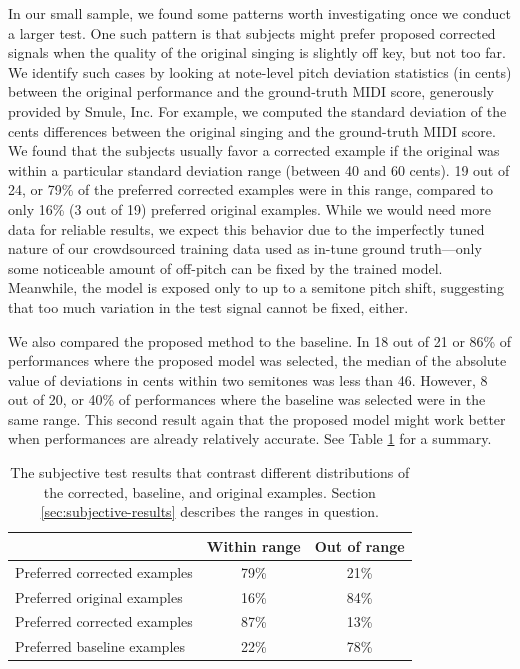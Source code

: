 In our small sample, we found some patterns worth investigating once we conduct a larger test. One such pattern is that subjects might prefer proposed corrected signals when the quality of the original singing is slightly off key, but not too far. We identify such cases by looking at note-level pitch deviation statistics (in cents) between the original performance and the ground-truth MIDI score, generously provided by Smule, Inc. For example, we computed the standard deviation of the cents differences between the original singing and the ground-truth MIDI score. We found that the subjects usually favor a corrected example if the original was within a particular standard deviation range (between 40 and 60 cents). 19 out of 24, or 79\% of the preferred corrected examples were in this range, compared to only 16\% (3 out of 19) preferred original examples. While we would need more data for reliable results, we expect this behavior due to the imperfectly tuned nature of our crowdsourced training data used as in-tune ground truth---only some noticeable amount of off-pitch can be fixed by the trained model. Meanwhile, the model is exposed only to up to a semitone pitch shift, suggesting that too much variation in the test signal cannot be fixed, either. 

We also compared the proposed method to the baseline. In 18 out of 21 or 86\% of performances where the proposed model was selected, the median of the absolute value of deviations in cents within two semitones was less than 46. However, 8 out of 20, or 40\% of performances where the baseline was selected were in the same range. This second result again that the proposed model might work better when performances are already relatively accurate. See Table \ref{tab:result-autotune} for a summary. 

\begin{table}[t]
  \begin{center}
  \vspace{-0.05in}
    \caption{The subjective test results that contrast different distributions of the corrected, baseline, and original examples. Section \ref{sec:subjective-results} describes the ranges in question.}
    \begin{tabular}{|l||c|c|}
    \hline
      & Within range & Out of range \\
      \hline
      Preferred corrected examples & 79\% & 21\% \\
      Preferred original examples & 16\% & 84\% \\
      \hline
      Preferred corrected examples & 87\% & 13\% \\
      Preferred baseline examples & 22\% & 78\% \\
      \hline
    \end{tabular}
    \vspace{-0.2in}
    \label{tab:result-autotune}
  \end{center}
\end{table}

